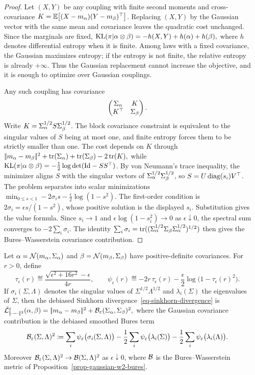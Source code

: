\begin{proof}
Let $(X,Y)$ be any coupling with finite second moments and cross-covariance
\(K=\mathbb{E}\big[(X-m_\alpha)(Y-m_\beta)^\top\big]\).
Replacing $(X,Y)$ by the Gaussian vector with the same mean and covariance leaves the quadratic cost unchanged. Since the marginals are fixed, \(\operatorname{KL}(\pi|\alpha\otimes\beta) = -h(X,Y)+h(\alpha)+h(\beta),\)
where $h$ denotes differential entropy when it is finite. Among laws with a fixed covariance, the Gaussian maximizes entropy; if the entropy is not finite, the relative entropy is already $+\infty$. Thus the Gaussian replacement cannot increase the objective, and it is enough to optimize over Gaussian couplings.

Any such coupling has covariance
\[
\begin{pmatrix}
\Sigma_\alpha & K\\
K^\top & \Sigma_\beta
\end{pmatrix}.
\]
Write $K=\Sigma_\alpha^{1/2}S\Sigma_\beta^{1/2}$. The block covariance constraint is equivalent to the singular values of $S$ being at most one, and finite entropy forces them to be strictly smaller than one. The cost depends on $K$ through
\(|\!| m_\alpha-m_\beta |\!|^2+\operatorname{tr}(\Sigma_\alpha)+\operatorname{tr}(\Sigma_\beta)-2\operatorname{tr}(K),\)
while $\operatorname{KL}(\pi|\alpha\otimes\beta)=-\frac12\log\det(\mathrm{Id}-SS^\top)$.
By von Neumann's trace inequality, the minimizer aligns $S$ with the singular vectors of $\Sigma_\alpha^{1/2}\Sigma_\beta^{1/2}$, so $S=U\operatorname{diag}(s_i)V^\top$. The problem separates into scalar minimizations
\(\min_{0\leq s<1} -2\sigma_i s-\frac{\epsilon}{2}\log(1-s^2).\)
The first-order condition is $2\sigma_i=\epsilon s/(1-s^2)$, whose positive solution is the displayed $s_i$. Substitution gives the value formula. Since $s_i\to1$ and $\epsilon\log(1-s_i^2)\to0$ as $\epsilon\downarrow0$, the spectral sum converges to $-2\sum_i\sigma_i$. The identity $\sum_i\sigma_i=\operatorname{tr}((\Sigma_\alpha^{1/2}\Sigma_\beta\Sigma_\alpha^{1/2})^{1/2})$ then gives the Bures--Wasserstein covariance contribution.
\end{proof}
\begin{cor}\label{cor-gaussian-sinkhorn-divergence}
Let $\alpha=\mathcal{N}(m_\alpha,\Sigma_\alpha)$ and $\beta=\mathcal{N}(m_\beta,\Sigma_\beta)$ have positive-definite covariances. For $r>0$, define
\[
\tau_\epsilon(r)
\eqdef
\frac{\sqrt{\epsilon^2+16r^2}-\epsilon}{4r},
\qquad
\psi_\epsilon(r)
\eqdef
-2r\,\tau_\epsilon(r)
-\frac{\epsilon}{2}\log\bigl(1-\tau_\epsilon(r)^2\bigr).
\]
If $\sigma_i(\Sigma,\Lambda)$ denotes the singular values of $\Sigma^{1/2}\Lambda^{1/2}$ and $\lambda_i(\Sigma)$ the eigenvalues of $\Sigma$, then the debiased Sinkhorn divergence~\eqref{eq-sinkhorn-divergence} is
\(\bar{\mathcal{L}}_{|\!| \cdot-\cdot |\!|^2}^{\varepsilon}(\alpha,\beta) = |\!| m_\alpha-m_\beta |\!|^2 + \mathcal{B}_\varepsilon(\Sigma_\alpha,\Sigma_\beta)^2,\)
where the Gaussian covariance contribution is the debiased smoothed Bures term
\[
\mathcal{B}_\varepsilon(\Sigma,\Lambda)^2
\coloneqq
\sum_i \psi_\varepsilon\bigl(\sigma_i(\Sigma,\Lambda)\bigr)
-\frac12\sum_i\psi_\varepsilon\bigl(\lambda_i(\Sigma)\bigr)
-\frac12\sum_i\psi_\varepsilon\bigl(\lambda_i(\Lambda)\bigr).
\]
Moreover $\mathcal{B}_\varepsilon(\Sigma,\Lambda)^2\to\mathcal{B}(\Sigma,\Lambda)^2$ as $\epsilon\downarrow0$, where $\mathcal{B}$ is the Bures--Wasserstein metric of Proposition~\ref{prop-gaussian-w2-bures}.
\end{cor}
